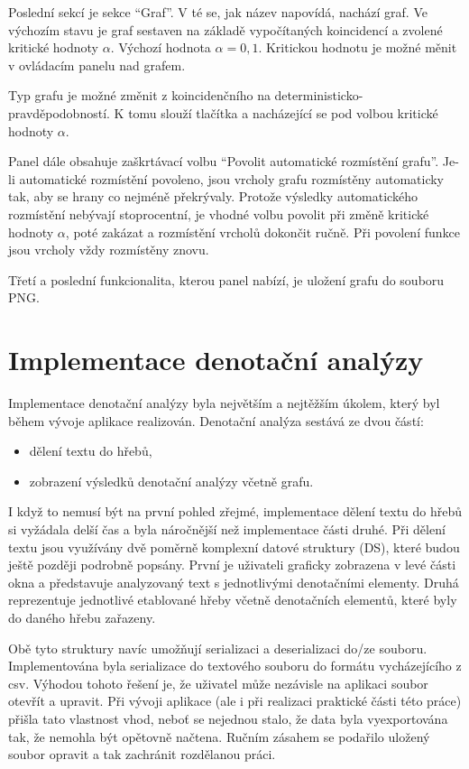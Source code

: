 \documentclass[dp.tex]{subfiles}
\begin{document}
Poslední sekcí je sekce \enquote{Graf}. V té se, jak název napovídá, nachází graf. Ve výchozím stavu je graf sestaven na základě vypočítaných koincidencí a zvolené kritické hodnoty $\alpha$. Výchozí hodnota $\alpha = 0,1$. Kritickou hodnotu je možné měnit v ovládacím panelu nad grafem. 

Typ grafu je možné změnit z koincidenčního na deterministicko-pravděpodobností. K tomu slouží tlačítka  a  nacházející se pod volbou kritické hodnoty $\alpha$. 

Panel dále obsahuje zaškrtávací volbu \enquote{Povolit automatické rozmístění grafu}. Je-li automatické rozmístění povoleno, jsou vrcholy grafu rozmístěny automaticky tak, aby se hrany co nejméně překrývaly. Protože výsledky automatického rozmístění nebývají stoprocentní, je vhodné volbu povolit při změně kritické hodnoty $\alpha$, poté zakázat a rozmístění vrcholů dokončit ručně. Při povolení funkce jsou vrcholy vždy rozmístěny znovu.

Třetí a poslední funkcionalita, kterou panel nabízí, je uložení grafu do souboru PNG.

\section{Implementace denotační analýzy}

Implementace denotační analýzy byla největším a nejtěžším úkolem, který byl během vývoje aplikace realizován. Denotační analýza sestává ze dvou částí:
\begin{itemize}
\item dělení textu do hřebů,
\item zobrazení výsledků denotační analýzy včetně grafu.
\end{itemize}

I když to nemusí být na první pohled zřejmé, implementace dělení textu do hřebů si vyžádala delší čas a byla náročnější než implementace části druhé. Při dělení textu jsou využívány dvě poměrně komplexní datové struktury (DS), které budou ještě později podrobně popsány. První je uživateli graficky zobrazena v levé části okna a představuje analyzovaný text s jednotlivými denotačními elementy. Druhá reprezentuje jednotlivé etablované hřeby včetně denotačních elementů, které byly do daného hřebu zařazeny. 

Obě tyto struktury navíc umožňují serializaci a deserializaci do/ze souboru. Implementována byla serializace do textového souboru do formátu vycházejícího z \acrshort{csv}. Výhodou tohoto řešení je, že uživatel může nezávisle na aplikaci soubor otevřít a upravit. Při vývoji aplikace (ale i při realizaci praktické části této práce) přišla tato vlastnost vhod, neboť se nejednou stalo, že data byla vyexportována tak, že nemohla být opětovně načtena. Ručním zásahem se podařilo uložený soubor opravit a tak zachránit rozdělanou práci.
\end{document}
